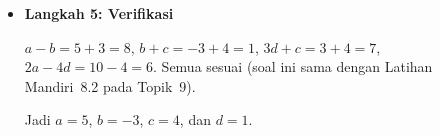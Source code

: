 \documentclass[10pt,a4paper]{article}
\begin{document}
\begin{enumerate}
\begin{itemize}
\item \textbf{Langkah 5: Verifikasi}

$a - b = 5 + 3 = 8$, $b + c = -3 + 4 = 1$, $3d + c = 3 + 4 = 7$, $2a - 4d = 10 - 4 = 6$. Semua sesuai (soal ini sama dengan Latihan Mandiri~8.2 pada Topik~9).

Jadi $a = 5$, $b = -3$, $c = 4$, dan $d = 1$.
\end{itemize}

\end{enumerate}
\end{document}
